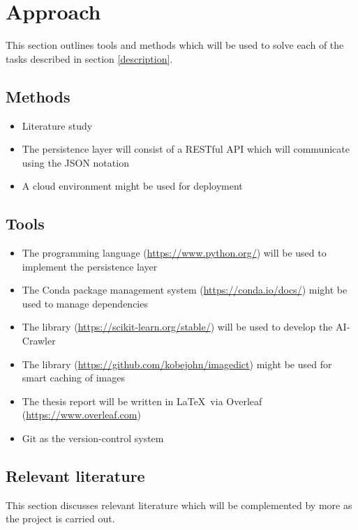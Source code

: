 \section{Approach}

This section outlines tools and methods which will be used to solve each of the tasks described in section \ref{description}.

\subsection{Methods}
\begin{itemize}
    \item Literature study
    \item The persistence layer will consist of a RESTful API which will communicate using the JSON notation
    \item A cloud environment might be used for deployment
\end{itemize}

\subsection{Tools}
 
\begin{itemize}
    \item The \Python programming language (\url{https://www.python.org/}) will be used to implement the persistence layer
    \item The Conda package management system (\url{https://conda.io/docs/}) might be used to manage \Python dependencies
    \item The \Python library \scikit (\url{https://scikit-learn.org/stable/}) will be used to develop the AI-Crawler
    \item The \Python library \ImageDict (\url{https://github.com/kobejohn/imagedict}) might be used for smart caching of images
    \item The thesis report will be written in \LaTeX ~via Overleaf (\url{https://www.overleaf.com})
    \item Git as the version-control system
\end{itemize}

\subsection{Relevant literature}

This section discusses relevant literature which will be complemented by more as the project is carried out.


